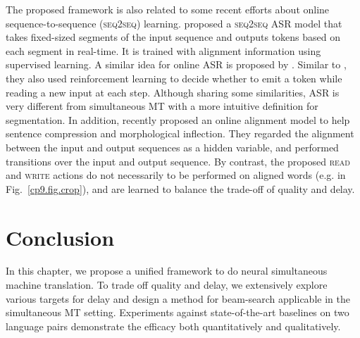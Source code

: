 The proposed framework is also related to some recent efforts about online sequence-to-sequence (\textsc{seq2seq}) learning. 
\citep{jaitly2015online} proposed a \textsc{seq2seq} ASR model that takes fixed-sized segments of the input sequence and outputs tokens based on each segment in real-time. It is trained with alignment information using supervised learning. A similar idea for online ASR is proposed by \citep{luo2016learning}. Similar to \citep{satija2016simultaneous}, they also used reinforcement learning to decide whether to emit a token while reading a new input at each step. Although sharing some similarities, ASR is very different from simultaneous MT with a more intuitive definition for segmentation. 
In addition, \citep{yu2016online} recently proposed an online alignment model to help sentence compression and morphological inflection. They regarded the alignment between the input and output sequences as a hidden variable, and performed transitions over the input and output sequence. By contrast, the proposed \textsc{read} and \textsc{write} actions do not necessarily to be performed on aligned words (e.g. in Fig.~\ref{cp9.fig.crop}), and are learned to balance the trade-off of quality and delay.

\section{Conclusion}
In this chapter, we propose a unified framework to do neural simultaneous machine translation. 
To trade off quality and delay, we extensively explore various targets for delay and design a method for beam-search applicable in the simultaneous MT setting.
Experiments against state-of-the-art baselines on two language pairs demonstrate the efficacy both quantitatively and qualitatively.
